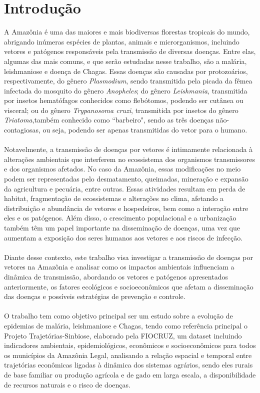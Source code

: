 \documentclass[12pt]{article}
\begin{document}
\newpage
\tableofcontents
\thispagestyle{empty}

\newpage
\section{Introdução}

A Amazônia é uma das maiores e mais biodiversas florestas tropicais do mundo, abrigando inúmeras espécies de plantas, animais e microrganismos, incluindo vetores e patógenos responsáveis pela transmissão de diversas doenças. Entre elas, algumas das mais comuns, e que serão estudadas nesse trabalho, são a malária, leishmaniose e doença de Chagas. Essas doenças são causadas por protozoários, respectivamente, do gênero \textit{Plasmodium}, sendo transmitida pela picada da fêmea infectada do mosquito do gênero \textit{Anopheles}; do gênero \textit{Leishmania}, transmitida por insetos hematófagos conhecidos como flebótomos, podendo ser cutânea ou visceral; ou do gênero \textit{Trypanosoma cruzi}, transmitida por insetos do gênero \textit{Triatoma},também conhecido como ``barbeiro", sendo as três doenças não-contagiosas, ou seja, podendo ser apenas transmitidas do vetor para o humano. 
\\\\
Notavelmente, a transmissão de doenças por vetores é intimamente relacionada à alterações ambientais que interferem no ecossistema dos organismos transmissores e dos organismos afetados. No caso da Amazônia, essas modificações no meio podem ser representadas pelo desmatamento, queimadas, mineração e expansão da agricultura e pecuária, entre outras. Essas atividades resultam em perda de habitat, fragmentação de ecossistemas e alterações no clima, afetando a distribuição e abundância de vetores e hospedeiros, bem como a interação entre eles e os patógenos. Além disso, o crescimento populacional e a urbanização também têm um papel importante na disseminação de doenças, uma vez que aumentam a exposição dos seres humanos aos vetores e aos riscos de infecção.
\\\\
Diante desse contexto, este trabalho visa investigar a transmissão de doenças por vetores na Amazônia e analisar como os impactos ambientais influenciam a dinâmica de transmissão, abordando os vetores e patógenos apresentados anteriormente, os fatores ecológicos e socioeconômicos que afetam a disseminação das doenças e possíveis estratégias de prevenção e controle.
\\\\
O trabalho tem como objetivo principal ser um estudo sobre a evolução de epidemias de malária, leishmaniose e Chagas, tendo como referência principal o Projeto Trajetórias-Sinbiose, elaborado pela FIOCRUZ, um dataset incluindo indicadores ambientais, epidemiológicos, econômicos e socioeconômicos para todos os municípios da Amazônia Legal, analisando a relação espacial e temporal entre trajetórias econômicas ligadas à dinâmica dos sistemas agrários, sendo eles rurais de base familiar ou produção agrícola e de gado em larga escala, a disponibilidade de recursos naturais e o risco de doenças. 
\end{document}
